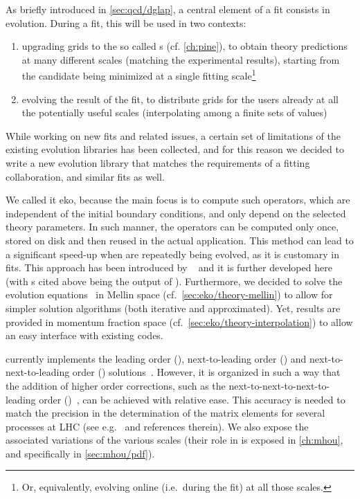 
As briefly introduced in \cref{sec:qcd/dglap}, a central element of a \pdf fit
consists in \dglap evolution.
%
During a fit, this will be used in two contexts: 
\begin{enumerate}[label=\roman*.]
  \item upgrading grids to the so called \fktab{}s (cf. \cref{ch:pine}), to
    obtain theory predictions at many different scales (matching the
    experimental results), starting from the \pdf candidate being minimized at
    a single fitting scale\footnote{
      Or, equivalently, evolving online (i.e.\ during the fit) at all those scales.
    }
  \item evolving the result of the fit, to distribute \pdf grids for the users
    already at all the potentially useful scales (interpolating among a finite
    sets of values)
\end{enumerate}

While working on new \pdf fits and related issues, a certain set of limitations
of the existing \dglap evolution libraries has been collected, and for this
reason we decided to write a new \qcd{} evolution library that matches the
requirements of a \pdf fitting collaboration, and similar fits as well.

We called it \acrfull{eko}, because the main focus is to compute such
operators, which are independent of the initial boundary conditions, and only
depend on the selected theory parameters.
In such manner, the operators can be computed only once, stored on disk and
then reused in the actual application. This method can lead to a significant
speed-up when \pdfs are repeatedly being evolved, as it is customary in \pdf{}
fits.
This approach has been introduced by
\fk~\cite{Ball:2008by,Ball:2010de,DelDebbio:2007ee} and it is further developed
here (with \fktab{}s cited above being the output of \fk).
%
Furthermore, we decided to solve the evolution equations~ in Mellin space (cf.\
\cref{sec:eko/theory-mellin}) to allow for simpler solution algorithms (both
iterative and approximated).
Yet, results are provided in momentum fraction space (cf.\
\cref{sec:eko/theory-interpolation}) to allow an easy interface with existing
codes.

\eko{} currently implements the leading order (\lo{}),
next-to-leading order (\nlo{}) and next-to-next-to-leading order (\nnlo{})
solutions~\cite{Vogt:2004mw,Moch:2004pa,Blumlein:2021enk}.
However, it is organized in such a way that the addition of higher order corrections,
such as the next-to-next-to-next-to-leading order (\nnnlo{})~\cite{Moch:2021qrk},
can be achieved with relative ease.
This accuracy is needed to match the precision in the determination of the
matrix elements for several processes at LHC (see e.g.\ \cite{Duhr:2021vwj} and
references therein).
We also expose the associated variations of the various scales (their role in
\pdfs is exposed in \cref{ch:mhou}, and specifically in \cref{sec:mhou/pdf}).

